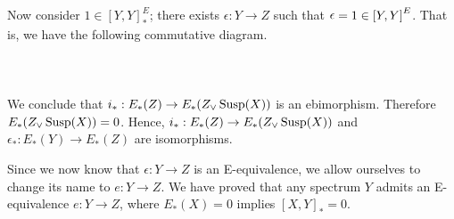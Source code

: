 \documentclass[../main]{subfiles}
\begin{document}
Now consider $1 \in \left[Y,Y\right]^E_{\ast}$; there exists $\epsilon\colon Y  \to Z $ such that $\mathop{\mathrm{\epsilon}} = 1 \in \left[Y,Y\right]^E $. That is, we have the following commutative diagram.
~\\~\\
~\\~\\
We conclude that $i_{\ast}: E_{\ast}(Z) \to E_{\ast}(Z_{\vee}\mathop{\mathrm{Susp}}(X))$ is an ebimorphism.
Therefore $E_{\ast}(Z_{\vee}\mathop{\mathrm{Susp}}(X))=0$. Hence, $i_{\ast}: E_{\ast}(Z) \to E_{\ast}(Z_{\vee}\mathop{\mathrm{Susp}}(X))$ and $ \epsilon_{\ast}: E_{\ast}(Y) \to E_{\ast}(Z)$ are isomorphisms.

Since we now know that $\epsilon\colon Y  \to Z $ is an E-equivalence, we allow ourselves to change its name to $e\colon  Y \to  Z $. We have proved that any spectrum $Y$ admits an E-equivalence $e\colon  Y \to  Z $, where $E_{\ast}(X)=0$ implies $ \left[X,Y\right]_{\ast}=0$. 
\end{document}
